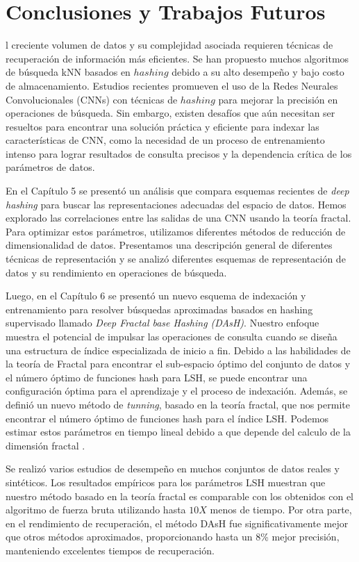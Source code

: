 \chapter{Conclusiones y Trabajos Futuros}
 
l creciente volumen de datos y su complejidad asociada requieren técnicas de recuperación de información   más eficientes. Se han propuesto muchos algoritmos de búsqueda kNN basados  en  $hashing$  debido a su alto desempeño  y bajo costo de almacenamiento. Estudios recientes promueven el uso de la Redes Neurales Convolucionales (CNNs) con técnicas de $hashing$ para mejorar la precisión en operaciones de búsqueda. Sin embargo, existen desafíos que aún necesitan ser resueltos   para encontrar una solución práctica y eficiente para indexar las características de CNN, como la necesidad de un proceso de entrenamiento intenso para lograr resultados de consulta precisos y la dependencia crítica de los parámetros de datos.

En el Capítulo 5 se presentó un análisis  que compara esquemas recientes de \textit{deep hashing} para  buscar las   representaciones adecuadas del espacio de datos. Hemos explorado las correlaciones entre las salidas de una CNN usando la teoría fractal. Para optimizar estos parámetros, utilizamos diferentes métodos de reducción de dimensionalidad de datos. Presentamos una descripción general de  diferentes técnicas de representación y se analizó  diferentes esquemas  de representación de datos y  su rendimiento en operaciones de búsqueda. 

Luego, en el Capítulo 6  se presentó  un nuevo esquema de indexación y entrenamiento para resolver   búsquedas aproximadas  basados en  hashing supervisado llamado \textit{Deep Fractal base Hashing (DAsH)}. Nuestro enfoque muestra el potencial de impulsar las operaciones de consulta cuando se diseña una estructura de índice especializada de inicio a fin. Debido a las habilidades de la teoría de Fractal para encontrar el sub-espacio óptimo del conjunto de datos y el número óptimo de funciones hash para LSH, se puede encontrar una configuración óptima para el aprendizaje y el proceso de indexación. Además, se definió  un nuevo método de \textit{tunning}, basado en la teoría fractal, que nos permite encontrar el número óptimo de funciones hash para el índice LSH. Podemos estimar estos parámetros en tiempo lineal debido a que depende del calculo de la dimensión fractal .

Se realizó varios  estudios de desempeño en muchos conjuntos de datos reales y sintéticos. Los resultados empíricos para los parámetros LSH muestran que nuestro método basado en la teoría fractal es comparable con los obtenidos con el algoritmo de fuerza bruta utilizando hasta $10X$ menos de tiempo. Por otra parte, en el rendimiento de recuperación, el método DAsH fue significativamente mejor que otros métodos aproximados, proporcionando hasta un 8\% mejor precisión, manteniendo excelentes tiempos de recuperación.

